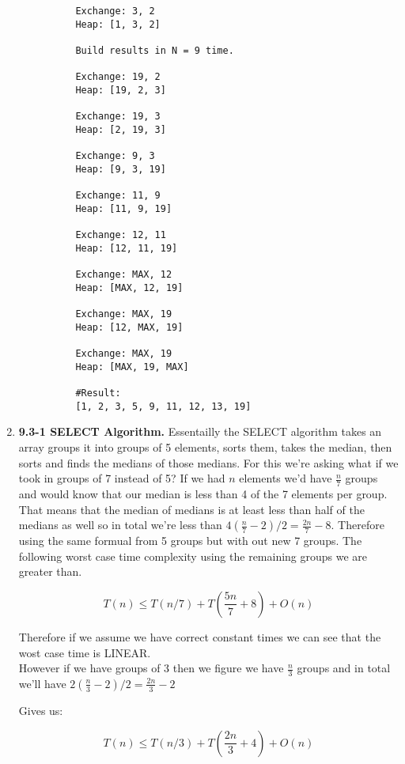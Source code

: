 \documentclass{article}
\begin{document}
\begin{enumerate}
\begin{lstlisting}
          Exchange: 3, 2
          Heap: [1, 3, 2]
          
          Build results in N = 9 time.
          
          Exchange: 19, 2
          Heap: [19, 2, 3]
          
          Exchange: 19, 3
          Heap: [2, 19, 3]
          
          Exchange: 9, 3
          Heap: [9, 3, 19]
          
          Exchange: 11, 9
          Heap: [11, 9, 19]
          
          Exchange: 12, 11
          Heap: [12, 11, 19]
          
          Exchange: MAX, 12
          Heap: [MAX, 12, 19]
          
          Exchange: MAX, 19
          Heap: [12, MAX, 19]
          
          Exchange: MAX, 19
          Heap: [MAX, 19, MAX]
          
          #Result:
          [1, 2, 3, 5, 9, 11, 12, 13, 19]
        \end{lstlisting}

        \item \textbf{9.3-1 SELECT Algorithm.}
        Essentailly the SELECT algorithm takes an array groups it into groups of 5 elements, sorts them, takes the median, then sorts and finds the medians of those medians.
        For this we're asking what if we took in groups of 7 instead of 5? 
        If we had $n$ elements we'd have $\frac{n}{7}$ groups and would know that our median is less than 4 of the 7 elements per group. 
        That means that the median of medians is at least less than half of the medians as well so in total we're less than $4(\frac{n}{7} - 2) / 2 = \frac{2n}{7} - 8$.
        Therefore using the same formual from 5 groups but with out new 7 groups. The following worst case time complexity using the remaining groups we are greater than.

        \[T(n) \leq T(n/7) + T(\frac{5n}{7} + 8) + O(n)\]

        Therefore if we assume we have correct constant times we can see that the wost case time is LINEAR.\\

        However if we have groups of 3 then we figure we have $\frac{n}{3}$ groups and in total we'll have $2(\frac{n}{3} - 2) / 2 = \frac{2n}{3} - 2$

        Gives us:

        \[T(n) \leq T(n/3) + T(\frac{2n}{3} + 4) + O(n)\]

  \end{enumerate}
\end{document}
